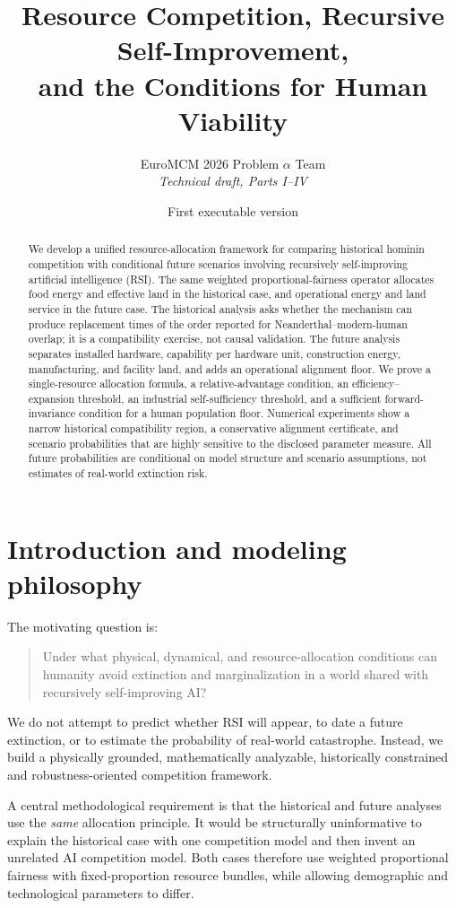\documentclass[11pt]{article}
\title{Resource Competition, Recursive Self-Improvement,\\ and the Conditions for Human Viability}
\author{EuroMCM 2026 Problem $\alpha$ Team\\\textit{Technical draft, Parts I--IV}}
\date{First executable version}
\begin{document}
\maketitle

\begin{abstract}
We develop a unified resource-allocation framework for comparing historical hominin competition with conditional future scenarios involving recursively self-improving artificial intelligence (RSI). The same weighted proportional-fairness operator allocates food energy and effective land in the historical case, and operational energy and land service in the future case. The historical analysis asks whether the mechanism can produce replacement times of the order reported for Neanderthal--modern-human overlap; it is a compatibility exercise, not causal validation. The future analysis separates installed hardware, capability per hardware unit, construction energy, manufacturing, and facility land, and adds an operational alignment floor. We prove a single-resource allocation formula, a relative-advantage condition, an efficiency--expansion threshold, an industrial self-sufficiency threshold, and a sufficient forward-invariance condition for a human population floor. Numerical experiments show a narrow historical compatibility region, a conservative alignment certificate, and scenario probabilities that are highly sensitive to the disclosed parameter measure. All future probabilities are conditional on model structure and scenario assumptions, not estimates of real-world extinction risk.
\end{abstract}

\section{Introduction and modeling philosophy}

The motivating question is:
\begin{quote}
Under what physical, dynamical, and resource-allocation conditions can humanity avoid extinction and marginalization in a world shared with recursively self-improving AI?
\end{quote}
We do not attempt to predict whether RSI will appear, to date a future extinction, or to estimate the probability of real-world catastrophe. Instead, we build a physically grounded, mathematically analyzable, historically constrained and robustness-oriented competition framework.

A central methodological requirement is that the historical and future analyses use the \emph{same} allocation principle. It would be structurally uninformative to explain the historical case with one competition model and then invent an unrelated AI competition model. Both cases therefore use weighted proportional fairness with fixed-proportion resource bundles, while allowing demographic and technological parameters to differ.
\end{document}
